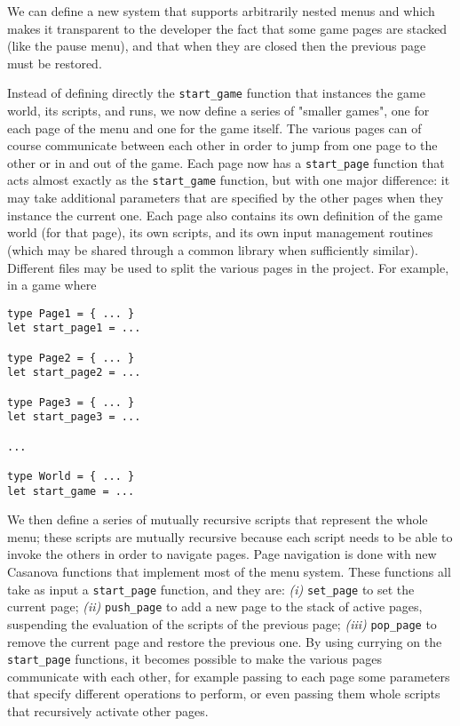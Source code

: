 We can define a new system that supports arbitrarily nested menus and which makes it transparent to the developer the fact that some game pages are stacked (like the pause menu), and that when they are closed then the previous page must be restored.

Instead of defining directly the \texttt{start\_game} function that instances the game world, its scripts, and runs, we now define a series of "smaller games", one for each page of the menu and one for the game itself. The various pages can of course communicate between each other in order to jump from one page to the other or in and out of the game. Each page now has a \texttt{start\_page} function that acts almost exactly as the \texttt{start\_game} function, but with one major difference: it may take additional parameters that are specified by the other pages when they instance the current one. Each page also contains its own definition of the game world (for that page), its own scripts, and its own input management routines (which may be shared through a common library when sufficiently similar). Different files may be used to split the various pages in the project. For example, in a game where

\begin{lstlisting}
type Page1 = { ... }
let start_page1 = ...

type Page2 = { ... }
let start_page2 = ...

type Page3 = { ... }
let start_page3 = ...

...

type World = { ... }
let start_game = ...
\end{lstlisting}

We then define a series of mutually recursive scripts that represent the whole menu; these scripts are mutually recursive because each script needs to be able to invoke the others in order to navigate pages. Page navigation is done with new Casanova functions that implement most of the menu system. These functions all take as input a \texttt{start\_page}  function, and they are: \textit{(i)} \texttt{set\_page} to set the current page; \textit{(ii)} \texttt{push\_page} to add a new page to the stack of active pages, suspending the evaluation of the scripts of the previous page; \textit{(iii)} \texttt{pop\_page} to remove the current page and restore the previous one. By using currying on the \texttt{start\_page} functions, it becomes possible to make the various pages communicate with each other, for example passing to each page some parameters that specify different operations to perform, or even passing them whole scripts that recursively activate other pages.

